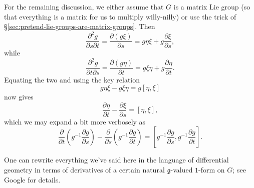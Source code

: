\documentclass[reqno]{amsart} 
\begin{document}
For the remaining discussion, we either assume that $G$ is a matrix Lie group (so that everything is a matrix for us to multiply willy-nilly) or use the trick of \S\ref{sec:pretend-lie-groups-are-matrix-groups}.  Then
\begin{equation*}
  \frac{\partial ^2 g }{\partial s \partial t} = \frac{\partial (g \xi) }{\partial s} = g \eta \xi + g \frac{\partial \xi }{ \partial s},
\end{equation*}
while
\begin{equation*}
  \frac{\partial ^2 g }{\partial t \partial s} = \frac{\partial (g \eta) }{\partial t} = g \xi \eta + g \frac{\partial \eta }{ \partial t}.
\end{equation*}
Equating the two and using the key relation
\begin{equation*}
  g \eta \xi - g \xi \eta = g [\eta,\xi]
\end{equation*}
now gives
\begin{equation}\label{eq:cartan-maurer}
  \frac{\partial \eta }{\partial t} - \frac{\partial \xi }{\partial s}
  = [\eta,\xi],
\end{equation}
which we may expand a bit more verbosely as
\begin{equation}\label{eq:cartan-maurer-expanded}
  \frac{\partial}{\partial t}
  (g^{-1} \frac{\partial g}{\partial s})
  - \frac{\partial}{\partial s}
  (g^{-1} \frac{\partial g}{\partial t})
  =
  [g^{-1} \frac{\partial g}{\partial s},
  g^{-1} \frac{\partial g}{\partial t}].
\end{equation}

One can rewrite everything we've said here in the language of differential geometry in terms of derivatives of a certain natural $\mathfrak{g}$-valued $1$-form on $G$; see Google for details.
\end{document}
